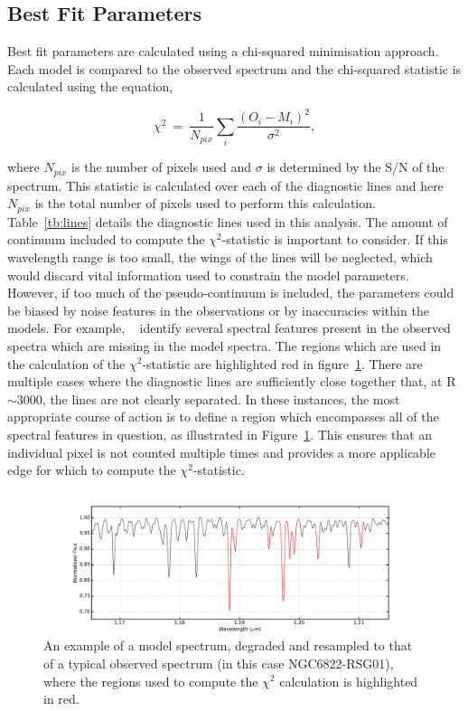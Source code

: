 \subsection{Best Fit Parameters} %
\label{sub:best_fit_parameters}

Best fit parameters are calculated using a chi-squared minimisation approach.
Each model is compared to the observed spectrum
and the chi-squared statistic is calculated using the equation,

\begin{equation}
    \chi^{2}~=~\frac{1}{N_{pix}}\sum\limits_{i}{\frac{(O_{i} - M_{i})^{2}}{\sigma^{2}}},
\end{equation}

where $N_{pix}$ is the number of pixels used and
$\sigma$ is determined by the S/N of the spectrum.
This statistic is calculated over each of the diagnostic lines and here $N_{pix}$ is the total number of pixels used to perform this calculation.
Table~\ref{tb:lines} details the diagnostic lines used in this analysis.
The amount of continuum included to compute the $\chi^{2}$-statistic is important to consider.
If this wavelength range is too small, the wings of the lines will be neglected,
which would discard vital information used to constrain the model parameters.
However, if too much of the pseudo-continuum is included, the parameters could be biased by noise features in the observations or by inaccuracies within the models.
For example,
~\cite{2014PhDT.........G} identify several spectral features present in the observed spectra which are missing in the model spectra.
The regions which are used in the calculation of the $\chi^{2}$-statistic are highlighted red in
figure~\ref{fig:lines}.
There are multiple cases where the diagnostic lines are sufficiently close together that, at R$\sim$3000,
the lines are not clearly separated.
In these instances, the most appropriate course of action is to define a region which encompasses all of the spectral features in question,
as illustrated in Figure~\ref{fig:lines}.
This ensures that an individual pixel is not counted multiple times and provides a more applicable edge for which to compute the $\chi^{2}$-statistic.

\begin{figure}
 \centering
 \includegraphics[width=\textwidth]{Diag-lines}
 \caption[Diagnostic lines]{
An example of a model spectrum, degraded and resampled to that of a typical observed spectrum (in this case NGC6822-RSG01), where the regions used to compute the $\chi^{2}$ calculation is highlighted in red.\label{fig:lines}
         }
\end{figure}

